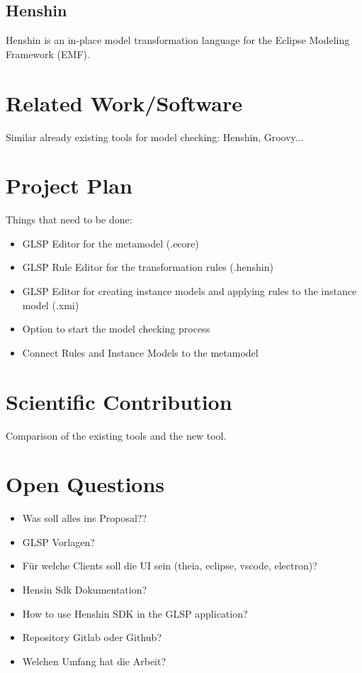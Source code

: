 \documentclass[conference,onecolumn]{IEEEtran}
\begin{document}
  \subsection{Henshin}
  \label{subsec:henshin}
  Henshin is an in-place model transformation language for the Eclipse Modeling Framework (EMF).
  \cite{henshin-repo}

  \section{Related Work/Software}
  \label{sec:related-work}

  Similar already existing tools for model checking: Henshin, Groovy...

  \section{Project Plan}
  \label{sec:project-plan}

  Things that need to be done:

  \begin{itemize}
    \item GLSP Editor for the metamodel (.ecore)
    \item GLSP Rule Editor for the transformation rules (.henshin)
    \item GLSP Editor for creating instance models and applying rules to the instance model (.xmi)
    \item Option to start the model checking process
    \item Connect Rules and Instance Models to the metamodel
  \end{itemize}

  \section{Scientific Contribution}
  \label{sec:scientific-contribution}

  Comparison of the existing tools and the new tool.

  \section{Open Questions}

  \begin{itemize}
    \item Was soll alles ins Proposal??
    \item GLSP Vorlagen?
    \item Für welche Clients soll die UI sein (theia, eclipse, vscode, electron)?
    \item Hensin Sdk Dokumentation?
    \item How to use Henshin SDK in the GLSP application?
    \item Repository Gitlab oder Github?
    \item Welchen Umfang hat die Arbeit?

  \end{itemize}
\end{document}

